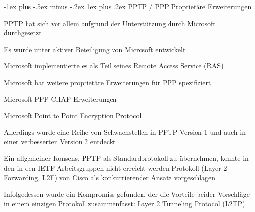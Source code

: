 \documentclass[a4paper]{article}
\makeatletter
\renewcommand{\subsubsection}{\@startsection{subsubsection}{3}{0mm}%
 {-1ex plus -.5ex minus -.2ex}%
 {1ex plus .2ex}%
 {\normalfont\small\bfseries}}
\makeatother
\begin{document}
\begin{multicols}{3}
      \subsubsection{PPTP / PPP Proprietäre Erweiterungen}
      \begin{itemize*}
            \item PPTP hat sich vor allem aufgrund der Unterstützung durch Microsoft durchgesetzt
            \begin{itemize*}
                  \item Es wurde unter aktiver Beteiligung von Microsoft entwickelt
                  \item Microsoft implementierte es als Teil seines Remote Access Service (RAS)
            \end{itemize*}
            \item Microsoft hat weitere proprietäre Erweiterungen für PPP spezifiziert
            \begin{itemize*}
                  \item Microsoft PPP CHAP-Erweiterungen
                  \item Microsoft Point to Point Encryption Protocol
            \end{itemize*}
            \item Allerdings wurde eine Reihe von Schwachstellen in PPTP Version 1 und auch in einer verbesserten Version 2 entdeckt
            \item Ein allgemeiner Konsens, PPTP als Standardprotokoll zu übernehmen, konnte in den in den IETF-Arbeitsgruppen nicht erreicht werden
             Protokoll (Layer 2 Forwarding, L2F) von Cisco als konkurrierender Ansatz vorgeschlagen
            \item Infolgedessen wurde ein Kompromiss gefunden, der die Vorteile beider Vorschläge in einem einzigen Protokoll zusammenfasst: Layer 2 Tunneling Protocol (L2TP)
      \end{itemize*}


\end{multicols}
\end{document}
